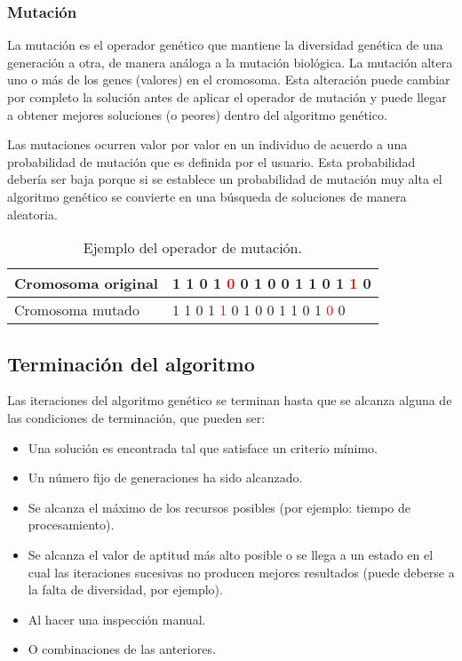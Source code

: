\subsubsection{Mutaci\'on}

La mutación es el operador genético que mantiene la diversidad genética de una generación a otra, de manera análoga a la mutación biológica. La mutación altera uno o más de los genes (valores) en el cromosoma. Esta alteración puede cambiar por completo la solución antes de aplicar el operador de mutación y puede llegar a obtener mejores soluciones (o peores) dentro del algoritmo genético.\par

Las mutaciones ocurren valor por valor en un individuo de acuerdo a una probabilidad de mutación que es definida por el usuario. Esta probabilidad debería ser baja porque si se establece un probabilidad de mutación muy alta el algoritmo genético se convierte en una búsqueda de soluciones de manera aleatoria.

\begin{table}[H]
  \centering
  \begin{tabular}{|l|l|}
  \hline
  Cromosoma original & 1 1 0 1 \textcolor{red}{0} 0 1 0 0 1 1 0 1 \textcolor{red}{1} 0  \\ \hline
  Cromosoma mutado   & 1 1 0 1 \textcolor{red}{1} 0 1 0 0 1 1 0 1 \textcolor{red}{0} 0  \\ \hline
  \end{tabular}
  \caption{Ejemplo del operador de mutación.}
\end{table}

\subsection{Terminaci\'on del algoritmo}

Las iteraciones del algoritmo genético se terminan hasta que se alcanza alguna de las condiciones de terminación, que pueden ser:

\begin{itemize}
  \item Una solución es encontrada tal que satisface un criterio mínimo.
  \item Un número fijo de generaciones ha sido alcanzado.
  \item Se alcanza el máximo de los recursos posibles (por ejemplo: tiempo de procesamiento).
  \item Se alcanza el valor de aptitud más alto posible o se llega a un estado en el cual las iteraciones sucesivas no producen mejores resultados (puede deberse a la falta de diversidad, por ejemplo).
  \item Al hacer una inspección manual.
  \item O combinaciones de las anteriores.
\end{itemize}


